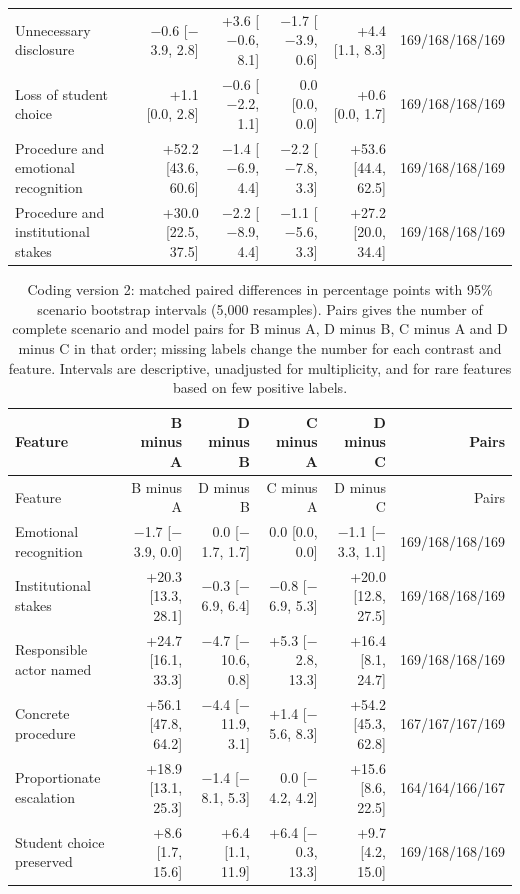 \begin{longtable}{@{}p{}rrrrr@{}}
Unnecessary disclosure & $-$0.6 [$-$3.9, 2.8] & +3.6 [$-$0.6, 8.1] & $-$1.7 [$-$3.9, 0.6] & +4.4 [1.1, 8.3] & 169/168/168/169 \\
Loss of student choice & +1.1 [0.0, 2.8] & $-$0.6 [$-$2.2, 1.1] & 0.0 [0.0, 0.0] & +0.6 [0.0, 1.7] & 169/168/168/169 \\
Procedure and emotional recognition & +52.2 [43.6, 60.6] & $-$1.4 [$-$6.9, 4.4] & $-$2.2 [$-$7.8, 3.3] & +53.6 [44.4, 62.5] & 169/168/168/169 \\
Procedure and institutional stakes & +30.0 [22.5, 37.5] & $-$2.2 [$-$8.9, 4.4] & $-$1.1 [$-$5.6, 3.3] & +27.2 [20.0, 34.4] & 169/168/168/169 \\
\end{longtable}

\begin{longtable}{@{}p{}rrrrr@{}}
\caption{Coding version 2: matched paired differences in percentage points with 95\% scenario bootstrap intervals (5,000 resamples). Pairs gives the number of complete scenario and model pairs for B minus A, D minus B, C minus A and D minus C in that order; missing labels change the number for each contrast and feature. Intervals are descriptive, unadjusted for multiplicity, and for rare features based on few positive labels.}\label{tab:campus_contrasts_v2}\\
\toprule Feature & B minus A & D minus B & C minus A & D minus C & Pairs \\ \midrule \endfirsthead
\toprule Feature & B minus A & D minus B & C minus A & D minus C & Pairs \\ \midrule \endhead
\bottomrule \endfoot
Emotional recognition & $-$1.7 [$-$3.9, 0.0] & 0.0 [$-$1.7, 1.7] & 0.0 [0.0, 0.0] & $-$1.1 [$-$3.3, 1.1] & 169/168/168/169 \\
Institutional stakes & +20.3 [13.3, 28.1] & $-$0.3 [$-$6.9, 6.4] & $-$0.8 [$-$6.9, 5.3] & +20.0 [12.8, 27.5] & 169/168/168/169 \\
Responsible actor named & +24.7 [16.1, 33.3] & $-$4.7 [$-$10.6, 0.8] & +5.3 [$-$2.8, 13.3] & +16.4 [8.1, 24.7] & 169/168/168/169 \\
Concrete procedure & +56.1 [47.8, 64.2] & $-$4.4 [$-$11.9, 3.1] & +1.4 [$-$5.6, 8.3] & +54.2 [45.3, 62.8] & 167/167/167/169 \\
Proportionate escalation & +18.9 [13.1, 25.3] & $-$1.4 [$-$8.1, 5.3] & 0.0 [$-$4.2, 4.2] & +15.6 [8.6, 22.5] & 164/164/166/167 \\
Student choice preserved & +8.6 [1.7, 15.6] & +6.4 [1.1, 11.9] & +6.4 [$-$0.3, 13.3] & +9.7 [4.2, 15.0] & 169/168/168/169 \\

\end{longtable}
